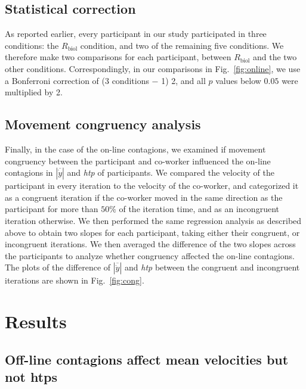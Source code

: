 \documentclass[a4paper, 12pt, oneside]{Thesis}  %
\begin{document}
\subsection{Statistical correction}
As reported earlier, every participant in our study participated in three conditions: the $R_{\text{biol}}$ condition, and two of the remaining five conditions. We therefore make two comparisons for each participant, between $R_{\text{biol}}$ and the two other conditions. Correspondingly, in our comparisons in Fig.~\ref{fig:online}, we use a Bonferroni correction of (3 conditions $-$ 1) 2, and all $p$ values below $0.05$ were multiplied by 2.

\subsection{Movement congruency analysis} \label{congSec}
Finally, in the case of the on-line contagions, we examined if movement congruency between the participant and co-worker influenced the on-line contagions in $|\overline{\dot{y}}|$ and {\it htp} of participants. We compared the velocity of the participant in every iteration to the velocity of the co-worker, and categorized it as a congruent iteration if the co-worker moved in the same direction as the participant for more than $50\%$ of the iteration time, and as an incongruent iteration otherwise. We then performed the same regression analysis as described above to obtain two slopes for each participant, taking either their congruent, or incongruent iterations. We then averaged the difference of the two slopes across the participants to analyze whether congruency affected the on-line contagions. The plots of the difference of $|\overline{\dot{y}}|$ and {\it htp} between the congruent and incongruent iterations are shown in Fig.~\ref{fig:cong}.



\clearpage
\section{Results}

\subsection{Off-line contagions affect mean velocities but not htps}
\end{document}
